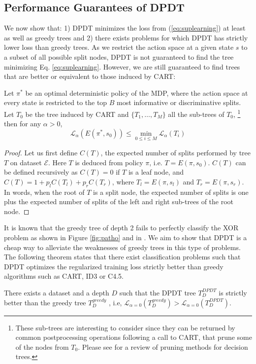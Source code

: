 \subsection{Performance Guarantees of DPDT}
We now show that: 1) DPDT minimizes the loss from (\ref{eq:suplearning}) at least as well as greedy trees and 2) there exists problems for which DPDT has strictly lower loss than greedy trees. 
As we restrict the action space at a given state $s$ to a subset of all possible split nodes, DPDT is not guaranteed to find the tree minimizing Eq. \ref{eq:suplearning}. However, we are still guaranteed to find trees that are better or equivalent to those induced by CART:
\begin{theorem}\label{prop:cart}
Let $\pi^*$ be an optimal deterministic policy of the MDP, where the action space at every state is restricted to the top $B$ most informative or discriminative splits. 
Let $T_0$ be the tree induced by CART and $\{T_1,\dots,T_M\}$ all the sub-trees of $T_0$, \footnote{These sub-trees are interesting to consider since they can be returned by common postprocessing operations following a call to CART, that prune some of the nodes from $T_0$. Please see \cite{pruning1} for a review of pruning methods for decision trees.} then for any $\alpha > 0$, 
\[
{\mathcal L}_\alpha(E(\pi^*, s_0)) \leq \min_{0\leq i\leq M}{\mathcal L}_\alpha(T_i)
\]
\end{theorem}

\begin{proof}
Let us first define $C(T)$, the expected number of splits performed by tree $T$ on dataset $\mathcal E$. 
Here $T$ is deduced from policy $\pi$, i.e. $T=E(\pi, s_0)$. $C(T)$ can be defined recursively as $C(T) = 0$ if $T$ is a leaf node, and $C(T) = 1 + p_l C(T_l) + p_r  C(T_r)$, where $T_l = E(\pi, s_l)$ and $T_r = E(\pi, s_r)$. 
In words, when the root of $T$ is a split node, the expected number of splits is one plus the expected number of splits of the left and right sub-trees of the root node.
\end{proof}

It is known that the greedy tree of depth 2 fails to perfectly classify the XOR problem as shown in Figure \ref{fig:patho} and in \cite{Murthy,how-eff}. We aim to show that DPDT is a cheap way to alleviate the weaknesses of greedy trees in this type of problems. The following theorem states that there exist classification problems such that DPDT optimizes the regularized training loss strictly better than greedy algorithms such as CART, ID3 or C4.5.
\begin{theorem}\label{thm:better_greedy}
There exists a dataset and a depth $D$ such that the DPDT tree $T^{DPDT}_D$ is strictly better than the greedy tree $T^{greedy}_{D}$ , i.e, $\mathcal{L}_{\alpha=0}(T^{greedy}_{D}) > \mathcal{L}_{\alpha=0}(T^{DPDT}_{D})$.
\end{theorem}

